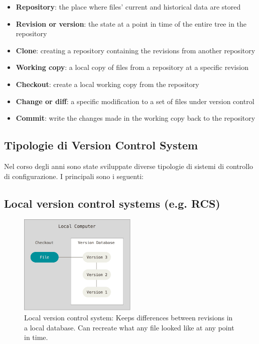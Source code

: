   \begin{itemize}
  \renewcommand\labelitemi{--}
  \setlength\itemsep{0.1em}
  \item \textbf{Repository}: the place where files' current and historical data
    are stored
  \item \textbf{Revision or version}: the state at a point in time of the entire
    tree in the repository
  \item \textbf{Clone}: creating a repository containing the revisions from
    another repository
  \item \textbf{Working copy}: a local copy of files from a repository at a
    specific revision
  \item \textbf{Checkout}: create a local working copy from the repository
  \item \textbf{Change or diff}: a specific modification to a set of files under
    version control
  \item \textbf{Commit}: write the changes made in the working copy back to the
    repository
  \end{itemize}


\subsection{Tipologie di Version Control System}
Nel corso degli anni sono state sviluppate diverse tipologie di sistemi di controllo di configurazione. I principali sono i seguenti: \newpage


\subsection{Local version control systems (e.g. RCS)}


\begin{figure}[ht]
    \centering
    \includegraphics[width=0.5\textwidth]{lez1/localVCS.png}
    \caption{Local version control system: Keeps differences between revisions in a local database. Can recreate what any file looked like at any point in time. }
    \label{localVCS}
\end{figure}
\FloatBarrier


